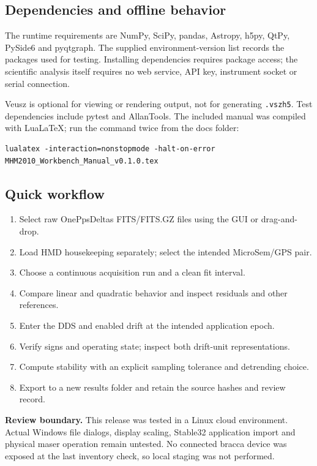 \documentclass[11pt,a4paper]{article}
\newcommand{\warning}[1]{\par\noindent\colorbox{light}{\parbox{\dimexpr\linewidth-2\fboxsep}{\textbf{Review boundary.} #1}}\par}
\begin{document}
\subsection{Dependencies and offline behavior}
The runtime requirements are NumPy, SciPy, pandas, Astropy, h5py, QtPy,
PySide6 and pyqtgraph. The supplied environment-version list records the
packages used for testing. Installing dependencies requires package access;
the scientific analysis itself requires no web service, API key, instrument
socket or serial connection.

Veusz is optional for viewing or rendering output, not for generating
\texttt{.vszh5}. Test dependencies include pytest and AllanTools. The included
manual was compiled with LuaLaTeX; run the command twice from the docs folder:
\begin{lstlisting}
lualatex -interaction=nonstopmode -halt-on-error MHM2010_Workbench_Manual_v0.1.0.tex
\end{lstlisting}

\subsection{Quick workflow}
\begin{enumerate}[leftmargin=6mm,itemsep=4pt]
\item Select raw OnePpsDeltas FITS/FITS.GZ files using the GUI or drag-and-drop.
\item Load HMD housekeeping separately; select the intended MicroSem/GPS pair.
\item Choose a continuous acquisition run and a clean fit interval.
\item Compare linear and quadratic behavior and inspect residuals and other references.
\item Enter the DDS and enabled drift at the intended application epoch.
\item Verify signs and operating state; inspect both drift-unit representations.
\item Compute stability with an explicit sampling tolerance and detrending choice.
\item Export to a new results folder and retain the source hashes and review record.
\end{enumerate}

\warning{This release was tested in a Linux cloud environment. Actual Windows
file dialogs, display scaling, Stable32 application import and physical
maser operation remain untested. No connected bracca device was exposed at the
last inventory check, so local staging was not performed.}
\clearpage
\end{document}
